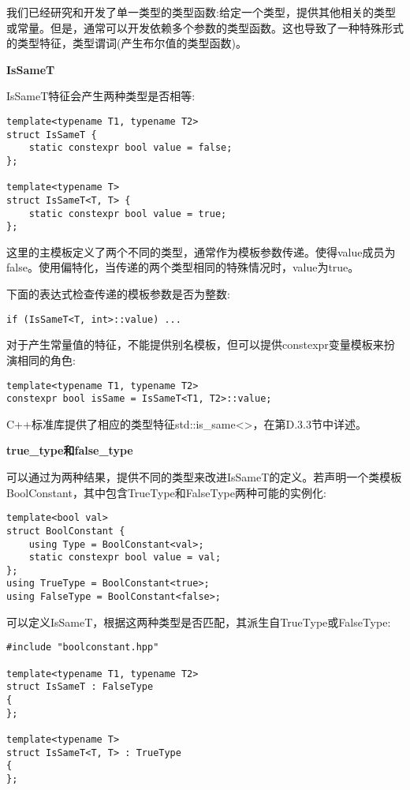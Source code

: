 我们已经研究和开发了单一类型的类型函数:给定一个类型，提供其他相关的类型或常量。但是，通常可以开发依赖多个参数的类型函数。这也导致了一种特殊形式的类型特征，类型谓词(产生布尔值的类型函数)。

\noindent
\textbf{IsSameT}

IsSameT特征会产生两种类型是否相等:

\begin{lstlisting}[style=styleCXX]
template<typename T1, typename T2>
struct IsSameT {
	static constexpr bool value = false;
};

template<typename T>
struct IsSameT<T, T> {
	static constexpr bool value = true;
};
\end{lstlisting}

这里的主模板定义了两个不同的类型，通常作为模板参数传递。使得value成员为false。使用偏特化，当传递的两个类型相同的特殊情况时，value为true。

下面的表达式检查传递的模板参数是否为整数:

\begin{lstlisting}[style=styleCXX]
if (IsSameT<T, int>::value) ...
\end{lstlisting}

对于产生常量值的特征，不能提供别名模板，但可以提供constexpr变量模板来扮演相同的角色:

\begin{lstlisting}[style=styleCXX]
template<typename T1, typename T2>
constexpr bool isSame = IsSameT<T1, T2>::value;
\end{lstlisting}

C++标准库提供了相应的类型特征std::is\_same<>，在第D.3.3节中详述。

\noindent
\textbf{true\_type和false\_type}

可以通过为两种结果，提供不同的类型来改进IsSameT的定义。若声明一个类模板BoolConstant，其中包含TrueType和FalseType两种可能的实例化:

\begin{lstlisting}[style=styleCXX]
template<bool val>
struct BoolConstant {
	using Type = BoolConstant<val>;
	static constexpr bool value = val;
};
using TrueType = BoolConstant<true>;
using FalseType = BoolConstant<false>;
\end{lstlisting}

可以定义IsSameT，根据这两种类型是否匹配，其派生自TrueType或FalseType:

\begin{lstlisting}[style=styleCXX]
#include "boolconstant.hpp"

template<typename T1, typename T2>
struct IsSameT : FalseType
{
};

template<typename T>
struct IsSameT<T, T> : TrueType
{
};
\end{lstlisting}

